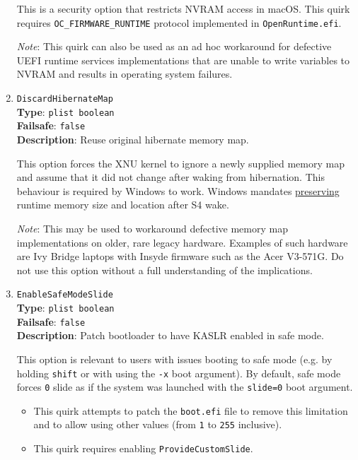 \documentclass[]{article}
\providecommand{\tightlist}{%
  \setlength{\itemsep}{0pt}\setlength{\parskip}{0pt}}
\begin{document}
\begin{enumerate}
  This is a security option that restricts NVRAM access in macOS.
  This quirk requires \texttt{OC\_FIRMWARE\_RUNTIME} protocol implemented
  in \texttt{OpenRuntime.efi}.

  \emph{Note}: This quirk can also be used as an ad hoc workaround for defective UEFI
  runtime services implementations that are unable to write variables to NVRAM
  and results in operating system failures.

\item
  \texttt{DiscardHibernateMap}\\
  \textbf{Type}: \texttt{plist\ boolean}\\
  \textbf{Failsafe}: \texttt{false}\\
  \textbf{Description}: Reuse original hibernate memory map.

  This option forces the XNU kernel to ignore a newly supplied memory map and assume
  that it did not change after waking from hibernation. This behaviour is required by
   Windows to work. Windows mandates
  \href{https://docs.microsoft.com/en-us/windows-hardware/design/device-experiences/oem-uefi#hibernation-state-s4-transition-requirements}{preserving}
  runtime memory size and location after S4 wake.

  \emph{Note}: This may be used to workaround defective memory map implementations on older,
  rare legacy hardware. Examples of such hardware are Ivy Bridge laptops with Insyde firmware
  such as the Acer V3-571G. Do not use this option without a full understanding of the implications.

\item
  \texttt{EnableSafeModeSlide}\\
  \textbf{Type}: \texttt{plist\ boolean}\\
  \textbf{Failsafe}: \texttt{false}\\
  \textbf{Description}: Patch bootloader to have KASLR enabled in safe mode.

  This option is relevant to users with issues booting to safe mode
  (e.g. by holding \texttt{shift} or with using the \texttt{-x} boot argument). By
  default, safe mode forces \texttt{0} slide as if the system was launched with the
  \texttt{slide=0} boot argument.

  \begin{itemize}
    \tightlist
    \item This quirk attempts to patch the \texttt{boot.efi} file to remove this limitation
    and to allow using other values (from \texttt{1} to \texttt{255} inclusive).
    \item This quirk requires enabling \texttt{ProvideCustomSlide}.
    \end{itemize}


\end{enumerate}
\end{document}
